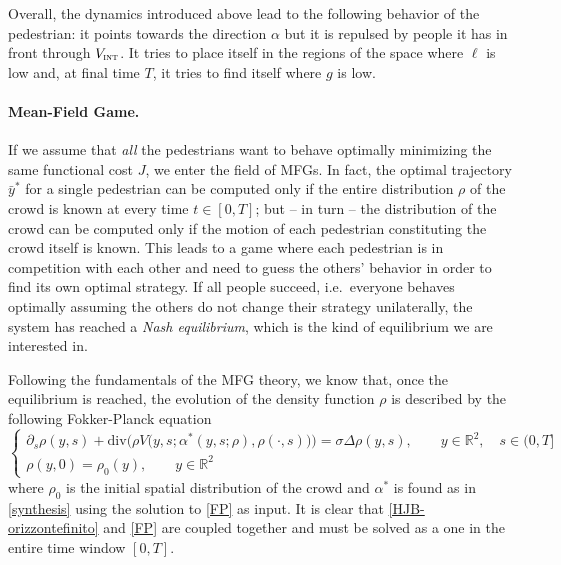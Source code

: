 \documentclass{cmslatex}
\newcommand{\R}{\mathbb{R}}
\newcommand{\Vi}{V_\textsc{int}}
\renewcommand{\r}{\rho}
\begin{document}
Overall, the dynamics introduced above lead to the following behavior of the pedestrian: it points towards the direction $\alpha$ but it is repulsed by people it has in front through $\Vi$. 
It tries to place itself in the regions of the space where $\ell$ is low and, at final time $T$, it tries to find itself where $g$ is low.

\medskip

\paragraph{Mean-Field Game.}
If we assume that \textit{all} the pedestrians want to behave optimally minimizing the same functional cost $J$, we enter the field of MFGs. 
In fact, the optimal trajectory $\bar y^*$ for a single pedestrian can be computed only if the entire distribution $\r$ of the crowd is known at every time $t\in[0,T]$; but -- in turn -- the distribution of the crowd can be computed only if the motion of each pedestrian constituting the crowd itself is known. This leads to a game where each pedestrian is in competition with each other and need to guess the others' behavior in order to find its own optimal strategy. If all people succeed, i.e.\ everyone behaves optimally assuming the others do not change their strategy unilaterally, the system has reached a \textit{Nash equilibrium}, which is the kind of equilibrium we are interested in. 

Following the fundamentals of the MFG theory, we know that, once the equilibrium is reached, the evolution of the density function $\r$ is described by the following Fokker-Planck equation
\begin{equation}\label{FP}
\left\{\begin{array}{ll}
\partial_s \r(y,s)  + \text{div} \Big(\rho V\big(y,s;\alpha^*(y,s;\r),\r(\cdot,s)\big)\Big) = \sigma\Delta\r(y,s),\qquad y\in\R^2, \quad s\in(0,T] \\ [2mm]
\r(y,0)=\r_0(y),\qquad y\in\R^2
\end{array}\right.
\end{equation}
where $\r_0$ is the initial spatial distribution of the crowd and $\alpha^*$ is found as in \eqref{synthesis} using the solution to \eqref{FP} as input. 
It is clear that \eqref{HJB-orizzontefinito} and \eqref{FP} are coupled together and must be solved as a one in the entire time window $[0,T]$.

\medskip
\end{document}
